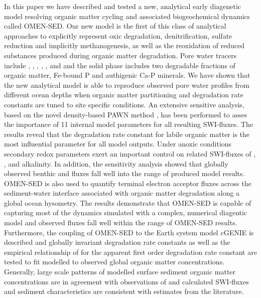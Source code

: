 \documentclass[gmd, manuscript]{copernicus}
\begin{document}
\conclusions  %
In this paper we have described and tested a new, analytical early diagenetic model resolving organic matter cycling and associated biogeochemical dynamics called OMEN-SED. 
Our new model is the first of this class of analytical approaches to explicitly represent oxic degradation, denitrification, sulfate reduction and implicitly methanogenesis, 
as well as the reoxidation of reduced substances produced during organic matter degradation. Pore water tracers include , , , , ,  and  and the solid phase includes 
two degradable fractions of organic matter, Fe-bound P and authigenic Ca-P minerals. 
We have shown that the new analytical model is able to reproduce observed pore water profiles from different ocean depths when organic matter partitioning and degradation rate constants are tuned to site specific conditions. An extensive sensitive analysis, 
based on the novel density-based PAWN method \citep{pianosi_simple_2015}, has been performed to asses the importance of 11 internal model parameters for all resulting SWI-fluxes. The results reveal that the degradation rate constant for labile organic 
matter is the most influential parameter for all model outputs. Under anoxic conditions secondary redox parameters exert an important control on related SWI-fluxes of , ,  and alkalinity. 
In addition, the sensitivity analysis showed that globally observed benthic  and  fluxes fall well into the range of produced model results. 
OMEN-SED is also used to quantify terminal electron acceptor fluxes across the sediment-water interface associated with organic matter degradation along a global ocean hysometry. 
The results demonstrate that OMEN-SED is capable of capturing most of the dynamics simulated with a complex, numerical diagentic model and observed fluxes fall well 
within the range of OMEN-SED results. 
Furthermore, the coupling of OMEN-SED to the Earth system model cGENIE is described and globally invariant degradation rate constants as well as the empirical relationship of \citet{boudreau1997diagenetic} for 
the apparent first order degradation rate constant are tested to fit modelled to observed global organic matter concentrations. Generally, large scale patterns of modelled surface sediment organic matter concentrations are in agreement with 
observations of \citet{seiter_organic_2004} and calculated SWI-fluxes and sediment characteristics are consistent with estimates from the literature. 
\end{document}
